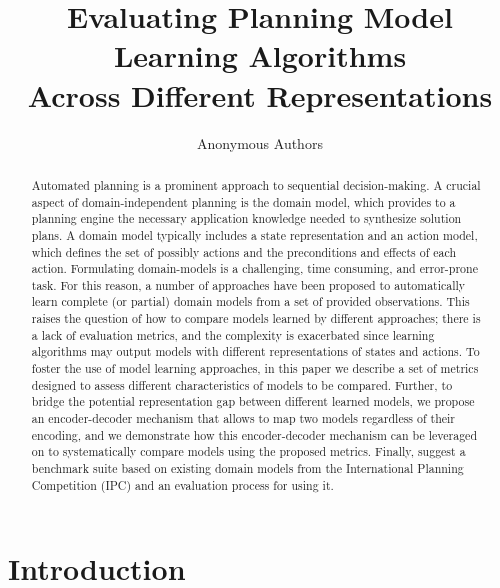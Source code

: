 \documentclass{article}
\title{Evaluating Planning Model Learning Algorithms \\ Across Different Representations}
\author{Anonymous Authors}
\theoremstyle{definition}
\theoremstyle{remark}
\begin{document}
\maketitle

\begin{abstract}
Automated planning is a prominent approach to sequential decision-making. A crucial aspect of domain-independent planning is the domain model, which provides to a planning engine the necessary application knowledge needed to synthesize solution plans. A domain model typically includes a state representation and an action model, which defines the set of possibly actions and the preconditions and effects of each action. 
Formulating domain-models is a challenging, time consuming, and error-prone task. For this reason, a number of approaches have been proposed to automatically learn complete (or partial) domain models from a set of provided observations. This raises the question of how to compare models learned by different approaches; there is a lack of evaluation metrics, and the complexity is exacerbated since learning algorithms may output models with different representations of states and actions. 
To foster the use of model learning approaches, in this paper we describe a set of metrics designed to assess different characteristics of models to be compared. Further, to bridge the potential representation gap between different learned models, we propose an encoder-decoder mechanism that allows to map two models regardless of their encoding, and we demonstrate how this encoder-decoder mechanism can be leveraged on to systematically compare models using the proposed metrics. Finally, suggest a benchmark suite based on existing domain models from the International Planning Competition (IPC) and an evaluation process for using it. 

\end{abstract}

\section{Introduction}
\end{document}

